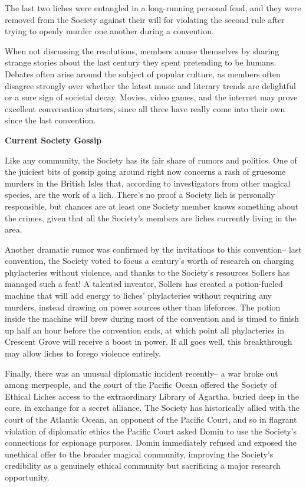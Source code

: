 \documentclass[blue]{Sel}
\begin{document}
The last two liches were entangled in a long-running personal feud, and they were removed from the Society against their will for violating the second rule after trying to openly murder one another during a convention.

When not discussing the resolutions, members amuse themselves by sharing strange stories about the last century they spent pretending to be humans. Debates often arise around the subject of popular culture, as members often disagree strongly over whether the latest music and literary trends are delightful or a sure sign of societal decay. Movies, video games, and the internet may prove excellent conversation starters, since all three have really come into their own since the last convention.

\textbf{Current Society Gossip}

Like any community, the Society has its fair share of rumors and politics. One of the juiciest bits of gossip going around right now concerns a rash of gruesome murders in the British Isles that, according to investigators from other magical species, are the work of a lich. There's no proof a Society lich is personally responsible, but chances are at least one Society member knows something about the crimes, given that all the Society's members are liches currently living in the area.

Another dramatic rumor was confirmed by the invitations to this convention-- last convention, the Society voted to focus a century's worth of research on charging phylacteries without violence, and thanks to the Society's resources Sollers has managed such a feat! A talented inventor, Sollers has created a potion-fueled machine that will add energy to liches' phylacteries without requiring any murders, instead drawing on power sources other than lifeforces. The potion inside the machine will brew during most of the convention and is timed to finish up half an hour before the convention ends, at which point all phylacteries in Crescent Grove will receive a boost in power. If all goes well, this breakthrough may allow liches to forego violence entirely.

Finally, there was an unusual diplomatic incident recently-- a war broke out among merpeople, and the court of the Pacific Ocean offered the Society of Ethical Liches access to the extraordinary Library of Agartha, buried deep in the core, in exchange for a secret alliance. The Society has historically allied with the court of the Atlantic Ocean, an opponent of the Pacific Court, and so in flagrant violation of diplomatic ethics the Pacific Court asked Domin to use the Society's connections for espionage purposes. Domin immediately refused and exposed the unethical offer to the broader magical community, improving the Society's credibility as a genuinely ethical community but sacrificing a major research opportunity.
\end{document}
